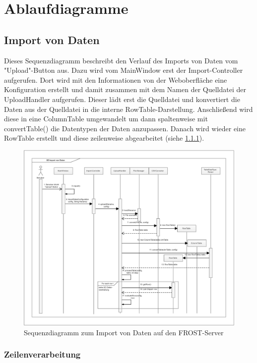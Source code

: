 \section{Ablaufdiagramme}

\subsection{Import von Daten}

Dieses Sequenzdiagramm beschreibt den Verlauf des Imports von Daten vom "{Upload}"{-Button} aus.
Dazu wird vom MainWindow erst der Import-Controller aufgerufen.
Dort wird mit den Informationen von der Weboberfläche eine Konfiguration erstellt und damit zusammen mit dem Namen der Quelldatei der UploadHandler aufgerufen.
Dieser lädt erst die Quelldatei und konvertiert die Daten aus der Quelldatei in die interne RowTable-Darstellung.
Anschließend wird diese in eine ColumnTable umgewandelt um dann spaltenweise mit convertTable() die Datentypen der Daten anzupassen.
Danach wird wieder eine RowTable erstellt und diese zeilenweise abgearbeitet (siehe \ref{verarbeitung}).
\vspace{\fill}
\begin{figure}[htbp]
\centering
\includegraphics[scale=0.45]{uml/SD_upload.eps}
\caption{Sequenzdiagramm zum Import von Daten auf den FROST-Server}
\end{figure}
\vspace{\fill}

\subsubsection{Zeilenverarbeitung}\label{verarbeitung}

